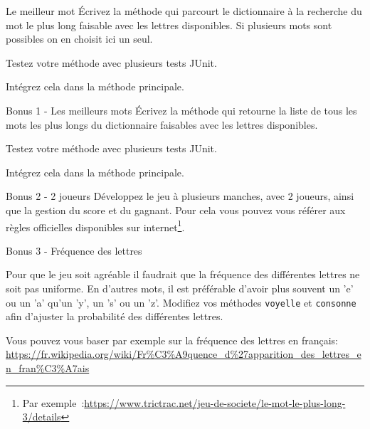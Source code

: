 \documentclass[a4paper,11pt]{style-esi/td}
\begin{document}
 	\begin{Exercice}{Le meilleur mot}
 	 	\'Ecrivez la méthode 
		qui parcourt le dictionnaire à la recherche du mot le plus long faisable 
		avec les lettres disponibles. 
		Si plusieurs mots sont possibles on en choisit ici un seul.

		Testez votre méthode avec plusieurs tests JUnit.

		 Intégrez cela dans la méthode principale.
	\end{Exercice}

 	\begin{Exercice}{Bonus 1 - Les meilleurs mots}
 	 	\'Ecrivez la méthode 
		qui retourne la liste de tous les mots les plus longs du dictionnaire 
		faisables avec les lettres disponibles.

		Testez votre méthode avec plusieurs tests JUnit.

		Intégrez cela dans la méthode principale.
	\end{Exercice}


 	\begin{Exercice}{Bonus 2 - 2 joueurs}
		Développez le jeu à plusieurs manches, avec 2 joueurs, 
		ainsi que la gestion du score et du gagnant.
		Pour cela vous pouvez vous référer aux règles officielles  
		disponibles sur internet\footnote{Par exemple~:\url{https://www.trictrac.net/jeu-de-societe/le-mot-le-plus-long-3/details}}.
	\end{Exercice}
		
 	\begin{Exercice}{Bonus 3 - Fréquence des lettres}
		
		Pour que le jeu soit agréable il faudrait que la fréquence des
		différentes lettres ne soit pas uniforme. En d'autres mots, il est
		préférable d'avoir plus souvent un 'e' ou un 'a' qu'un 'y', un 's'
		ou un 'z'. Modifiez vos méthodes \texttt{voyelle} et \texttt{consonne}
		afin d'ajuster la probabilité des différentes lettres. 
		
		Vous pouvez vous baser par exemple sur la fréquence des lettres en français:
		 \url{https://fr.wikipedia.org/wiki/Fr%C3%A9quence_d%27apparition_des_lettres_en_fran%C3%A7ais}
	
	 \end{Exercice}
		
\end{document}
